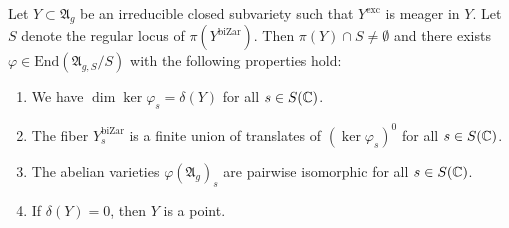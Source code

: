 \documentclass[12pt,oneside]{amsart}
\begin{document}
\begin{lemma}
  \label{lem:predegenerate}
  Let $Y\subset \mathfrak{A}_{g}$ be an irreducible closed subvariety
  such that $Y^{\mathrm{exc}}$ is meager in $Y$.
  Let
   $S$ denote the regular locus of  $\pi(Y^{\mathrm{biZar}})$. Then
   $\pi(Y)\cap S\not=\emptyset$ and there exists 
   $\varphi\in
  \mathrm{End}(\mathfrak{A}_{g,S}/S)$ with the following properties
  hold:
  \begin{enumerate}
  \item[(i)] We have
    $\dim \ker\varphi_s= \delta(Y)$ for all $s\in S({\mathbb{C}})$.
  \item[(ii)] The fiber  $Y^{\mathrm{biZar}}_s$ is
    a finite union of translates of $(\ker\varphi_s)^0$ for all $s\in
    S({\mathbb{C}})$.
  \item[(iii)] The abelian varieties $\varphi(\mathfrak{A}_{g})_s$ are
    pairwise isomorphic for all $s\in S({\mathbb{C}})$.
  \item[(iv)] If $\delta(Y)=0$, then $Y$ is a point. 
  \end{enumerate}
\end{lemma}
\end{document}
